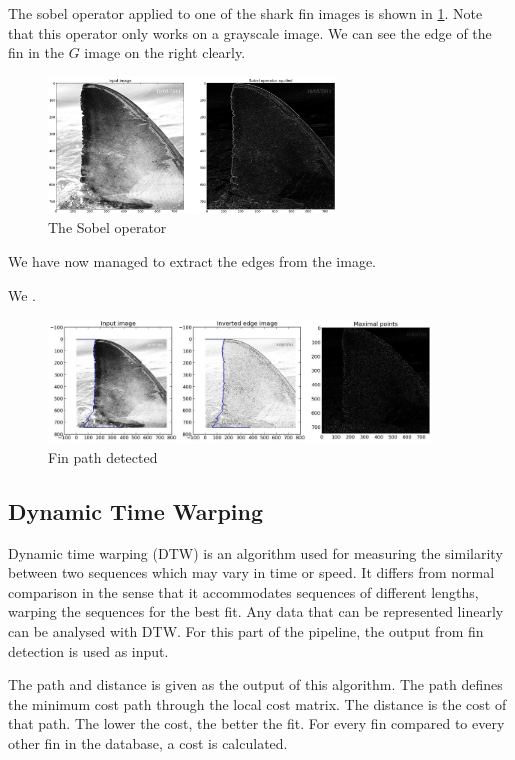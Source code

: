 \documentclass[a4paper,10pt]{article}
\begin{document}
The sobel operator applied to one of the shark fin images is shown in \ref{sobel}.  Note that this operator only works on a grayscale image.
We can see the edge of the fin in the $G$ image on the right clearly.

\begin{figure}[H]
 \centering
 \includegraphics[width=3in]{sobel.jpg}
 \caption{The Sobel operator}
 \label{sobel}
\end{figure}

We have now managed to extract the edges from the image.

We .

\begin{figure}[H]
 \centering
 \includegraphics[width=4in]{finpath.jpg}
 \caption{Fin path detected}
 \label{fin}
\end{figure}



\subsection{Dynamic Time Warping}
Dynamic time warping (DTW) is an algorithm used for measuring the similarity between two sequences which may vary in time or speed.
It differs from normal comparison in the sense that it accommodates sequences of different lengths, warping the sequences for the best fit.
Any data that can be represented linearly can be analysed with DTW.  For this part of the pipeline, the output from fin detection is used as input.

The path and distance is given as the output of this algorithm. The path defines the minimum cost path through the local cost matrix. 
The distance is the cost of that path. 
The lower the cost, the better the fit. For every fin compared to every other fin in the database, a cost is calculated.
\end{document}
